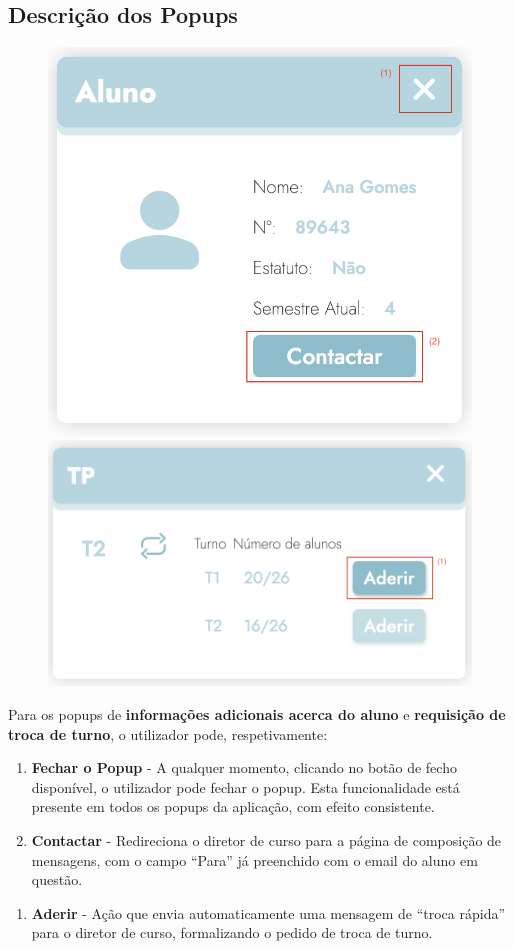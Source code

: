 \documentclass{article}
\begin{document}
\subsection{Descrição dos Popups}
\begin{figure}[H]
    \centering
    \includegraphics[width=0.3\linewidth]{manual/student-info-popup.png}
    \includegraphics[width=0.3\linewidth]{manual/request-shift-change-popup.png}
    \label{fig:enter-label}
\end{figure}
Para os popups de \textbf{informações adicionais acerca do aluno} e \textbf{requisição de troca de turno}, o utilizador pode, respetivamente:
\begin{enumerate}
    \item \textbf{Fechar o Popup} - A qualquer momento, clicando no botão de fecho disponível, o utilizador pode fechar o popup. Esta funcionalidade está presente em todos os popups da aplicação, com efeito consistente.
    \item \textbf{Contactar} - Redireciona o diretor de curso para a página de composição de mensagens, com o campo “Para” já preenchido com o email do aluno em questão.
\end{enumerate}
\noindent\makebox[\linewidth]{\rule{0.2\textwidth}{0.2pt}}
\begin{enumerate}
    \item \textbf{Aderir} - Ação que envia automaticamente uma mensagem de “troca rápida” para o diretor de curso, formalizando o pedido de troca de turno.
\end{enumerate}
\end{document}
